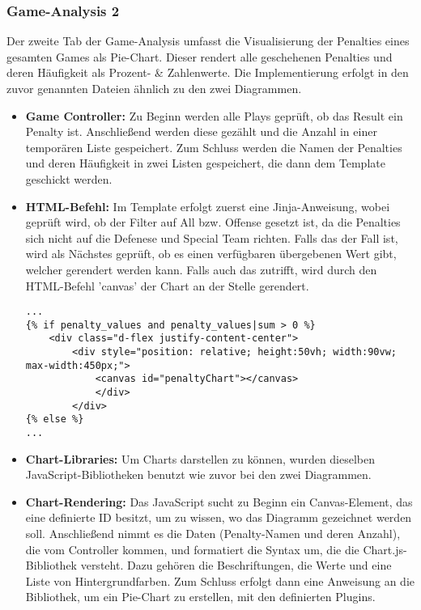 \subsubsection{Game-Analysis 2}
Der zweite Tab der Game-Analysis umfasst die Visualisierung der Penalties eines gesamten Games als Pie-Chart. Dieser rendert alle geschehenen Penalties und deren Häufigkeit als Prozent- \& Zahlenwerte. Die Implementierung erfolgt in den zuvor genannten Dateien ähnlich zu den zwei Diagrammen.
\begin{itemize}
    \item \textbf{Game Controller:} Zu Beginn werden alle Plays geprüft, ob das Result ein Penalty ist. Anschließend werden diese gezählt und die Anzahl in einer temporären Liste gespeichert. Zum Schluss werden die Namen der Penalties und deren Häufigkeit in zwei Listen gespeichert, die dann dem Template geschickt werden.
    \item \textbf{HTML-Befehl:} Im Template erfolgt zuerst eine Jinja-Anweisung, wobei geprüft wird, ob der Filter auf All bzw. Offense gesetzt ist, da die Penalties sich nicht auf die Defenese und Special Team richten. Falls das der Fall ist, wird als Nächstes geprüft, ob es einen verfügbaren übergebenen Wert gibt, welcher gerendert werden kann. Falls auch das zutrifft, wird durch den HTML-Befehl 'canvas' der Chart an der Stelle gerendert.
    \begin{verbatim}
...
{% if penalty_values and penalty_values|sum > 0 %}
    <div class="d-flex justify-content-center">
        <div style="position: relative; height:50vh; width:90vw; max-width:450px;">
            <canvas id="penaltyChart"></canvas>
            </div>
        </div>
{% else %}
...
    \end{verbatim}
    \item \textbf{Chart-Libraries:} Um Charts darstellen zu können, wurden dieselben JavaScript-Bibliotheken benutzt wie zuvor bei den zwei Diagrammen.

    \item \textbf{Chart-Rendering:} Das JavaScript sucht zu Beginn ein Canvas-Element, das eine definierte ID besitzt, um zu wissen, wo das Diagramm gezeichnet werden soll. Anschließend nimmt es die Daten (Penalty-Namen und deren Anzahl), die vom Controller kommen, und formatiert die Syntax um, die die Chart.js-Bibliothek versteht. Dazu gehören die Beschriftungen, die Werte und eine Liste von Hintergrundfarben. Zum Schluss erfolgt dann eine Anweisung an die Bibliothek, um ein Pie-Chart zu erstellen, mit den definierten Plugins.
\end{itemize}
